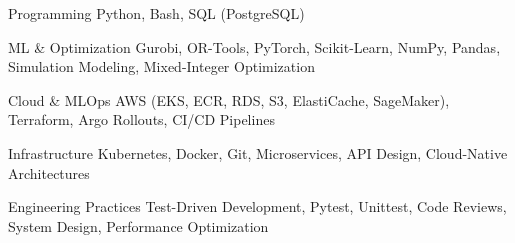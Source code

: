 


\begin{cvskills}


\cvskill
{Programming} %
{Python, Bash, SQL (PostgreSQL)} %


\cvskill
{ML \& Optimization} %
{Gurobi, OR-Tools, PyTorch, Scikit-Learn, NumPy, Pandas, Simulation Modeling, Mixed-Integer Optimization} %


\cvskill
{Cloud \& MLOps} %
{AWS (EKS, ECR, RDS, S3, ElastiCache, SageMaker), Terraform, Argo Rollouts, CI/CD Pipelines} %


\cvskill
{Infrastructure} %
{Kubernetes, Docker, Git, Microservices, API Design, Cloud-Native Architectures} %


\cvskill
{Engineering Practices} %
{Test-Driven Development, Pytest, Unittest, Code Reviews, System Design, Performance Optimization} %


\end{cvskills}
